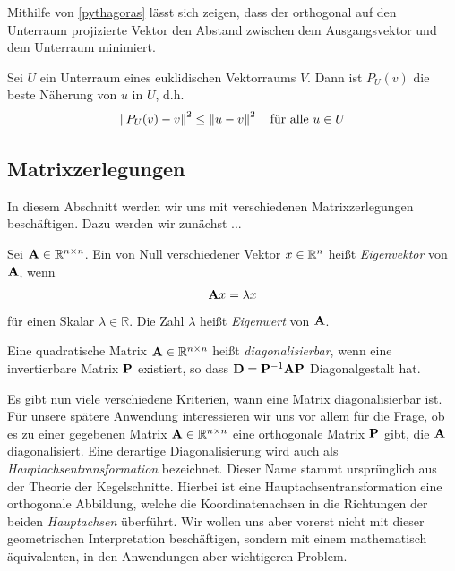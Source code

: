 Mithilfe von \ref{pythagoras} lässt sich zeigen, dass der orthogonal auf den Unterraum projizierte Vektor den Abstand zwischen dem Ausgangsvektor und dem Unterraum minimiert.

\begin{thm}
Sei $U$ ein Unterraum eines euklidischen Vektorraums $V$. Dann ist $P_U(v)$ die beste Näherung von $u$ in $U$, d.h.
$$\left\lVert P_U(v) - v \right\rVert^2 \leq \left\lVert u - v \right\rVert^2 \quad \text{für alle } u \in U$$
\end{thm}


\subsection{Matrixzerlegungen}

In diesem Abschnitt werden wir uns mit verschiedenen Matrixzerlegungen beschäftigen. Dazu werden wir zunächst ...

\begin{defn}
Sei $\mathbf{A} \in \mathbb{R}^{n \times n}$. Ein von Null verschiedener Vektor $x \in \mathbb{R}^n$ heißt \textit{Eigenvektor} von $\mathbf{A}$, wenn
$$\mathbf{A}x = \lambda x$$
für einen Skalar $\lambda \in \mathbb{R}$. Die Zahl $\lambda$ heißt \textit{Eigenwert} von $\mathbf{A}$.
\end{defn}

\begin{defn}
Eine quadratische Matrix $\mathbf{A} \in \mathbb{R}^{n \times n}$ heißt \textit{diagonalisierbar}, wenn eine invertierbare Matrix $\mathbf{P}$ existiert, so dass $\mathbf{D} = \mathbf{P}^{-1}\mathbf{A}\mathbf{P}$ Diagonalgestalt hat.
\end{defn}

Es gibt nun viele verschiedene Kriterien, wann eine Matrix diagonalisierbar ist. Für unsere spätere Anwendung interessieren wir uns vor allem für die Frage, ob es zu einer gegebenen Matrix $\mathbf{A} \in \mathbb{R}^{n \times n}$ eine orthogonale Matrix $\mathbf{P}$ gibt, die $\mathbf{A}$ diagonalisiert. Eine derartige Diagonalisierung wird auch als \textit{Hauptachsentransformation} bezeichnet. Dieser Name stammt ursprünglich aus der Theorie der Kegelschnitte. Hierbei ist eine Hauptachsentransformation eine orthogonale Abbildung, welche die Koordinatenachsen in die Richtungen der beiden \textit{Hauptachsen} überführt. Wir wollen uns aber vorerst nicht mit dieser geometrischen Interpretation beschäftigen, sondern mit einem mathematisch äquivalenten, in den Anwendungen aber wichtigeren Problem.

